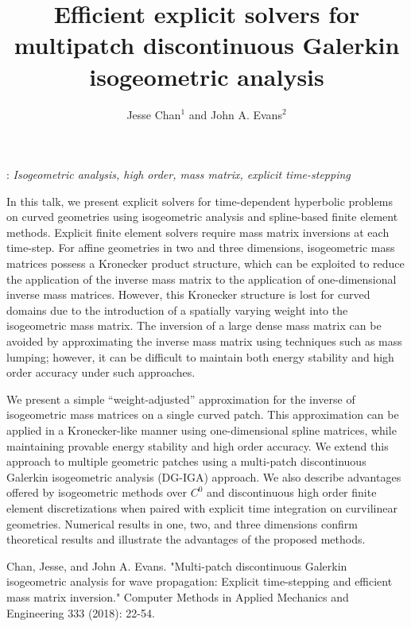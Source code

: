 \documentclass[12pt]{eccm-ecfd_abstract}
\title{Efficient explicit solvers for multipatch discontinuous Galerkin isogeometric analysis}
\author{Jesse Chan$^{1}$ and John A. Evans$^{2}$}
\begin{document}
: {\it Isogeometric analysis, high order, mass matrix, explicit time-stepping}
\vskip0.5cm

In this talk, we present explicit solvers for time-dependent hyperbolic problems on curved geometries using isogeometric analysis and spline-based finite element methods.  Explicit finite element solvers require mass matrix inversions at each time-step.  For affine geometries in two and three dimensions, isogeometric mass matrices possess a Kronecker product structure, which can be exploited to reduce the application of the inverse mass matrix to the application of one-dimensional inverse mass matrices.  However, this Kronecker structure is lost for curved domains due to the introduction of a spatially varying weight into the isogeometric mass matrix.  The inversion of a large dense mass matrix can be avoided by approximating the inverse mass matrix using techniques such as mass lumping; however, it can be difficult to maintain both energy stability and high order accuracy under such approaches.

We present a simple ``weight-adjusted'' approximation for the inverse of isogeometric mass matrices on a single curved patch.  This approximation can be applied in a Kronecker-like manner using one-dimensional spline matrices, while maintaining provable energy stability and high order accuracy.  We extend this approach to multiple geometric patches using a multi-patch discontinuous Galerkin isogeometric analysis (DG-IGA) approach.  We also describe advantages offered by isogeometric methods over $C^0$ and discontinuous high order finite element discretizations when paired with explicit time integration on curvilinear geometries.  Numerical results in one, two, and three dimensions confirm theoretical results and illustrate the advantages of the proposed methods.  

\begin{thebibliography}{99}
 Chan, Jesse, and John A. Evans. "Multi-patch discontinuous Galerkin isogeometric analysis for wave propagation: Explicit time-stepping and efficient mass matrix inversion." Computer Methods in Applied Mechanics and Engineering 333 (2018): 22-54.
\end{thebibliography}


\end{document}
